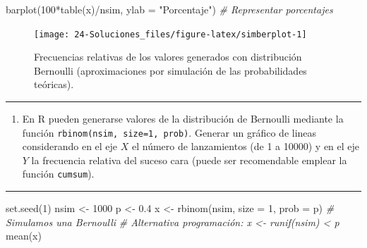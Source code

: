 \documentclass[
]{book}
\newenvironment{Shaded}{\begin{snugshade}}{\end{snugshade}}
\newcommand{\AttributeTok}[1]{\textcolor[rgb]{0.77,0.63,0.00}{#1}}
\newcommand{\CommentTok}[1]{\textcolor[rgb]{0.56,0.35,0.01}{\textit{#1}}}
\newcommand{\DecValTok}[1]{\textcolor[rgb]{0.00,0.00,0.81}{#1}}
\newcommand{\FloatTok}[1]{\textcolor[rgb]{0.00,0.00,0.81}{#1}}
\newcommand{\FunctionTok}[1]{\textcolor[rgb]{0.00,0.00,0.00}{#1}}
\newcommand{\NormalTok}[1]{#1}
\newcommand{\OtherTok}[1]{\textcolor[rgb]{0.56,0.35,0.01}{#1}}
\newcommand{\SpecialCharTok}[1]{\textcolor[rgb]{0.00,0.00,0.00}{#1}}
\newcommand{\StringTok}[1]{\textcolor[rgb]{0.31,0.60,0.02}{#1}}
\providecommand{\tightlist}{%
  \setlength{\itemsep}{0pt}\setlength{\parskip}{0pt}}
\theoremstyle{break}
\theoremstyle{nonumberplain}
\begin{document}
\begin{Shaded}
\begin{Highlighting}[]
\FunctionTok{barplot}\NormalTok{(}\DecValTok{100}\SpecialCharTok{*}\FunctionTok{table}\NormalTok{(x)}\SpecialCharTok{/}\NormalTok{nsim, }\AttributeTok{ylab =} \StringTok{"Porcentaje"}\NormalTok{) }\CommentTok{\# Representar porcentajes }
\end{Highlighting}
\end{Shaded}

\begin{figure}[!htb]

{\centering \texttt{[image: 24-Soluciones\_files/figure-latex/simberplot-1]} 

}

\caption{Frecuencias relativas de los valores generados con distribución Bernoulli (aproximaciones por simulación de las probabilidades teóricas).}\label{fig:simberplot}
\end{figure}

\begin{center}\rule{0.5\linewidth}{0.5pt}\end{center}

\begin{enumerate}
\def\labelenumi{\alph{enumi})}
\setcounter{enumi}{1}
\tightlist
\item
  En R pueden generarse valores de la distribución de Bernoulli
  mediante la función \texttt{rbinom(nsim,\ size=1,\ prob)}. Generar un
  gráfico de lineas considerando en el eje \(X\) el número de
  lanzamientos (de 1 a 10000) y en el eje \(Y\) la frecuencia
  relativa del suceso cara (puede ser recomendable emplear la
  función \texttt{cumsum}).
\end{enumerate}

\begin{center}\rule{0.5\linewidth}{0.5pt}\end{center}

\begin{Shaded}
\begin{Highlighting}[]
\FunctionTok{set.seed}\NormalTok{(}\DecValTok{1}\NormalTok{)}
\NormalTok{nsim }\OtherTok{\textless{}{-}} \DecValTok{1000}
\NormalTok{p }\OtherTok{\textless{}{-}} \FloatTok{0.4}
\NormalTok{x }\OtherTok{\textless{}{-}} \FunctionTok{rbinom}\NormalTok{(nsim, }\AttributeTok{size =} \DecValTok{1}\NormalTok{, }\AttributeTok{prob =}\NormalTok{ p) }\CommentTok{\# Simulamos una Bernoulli}
\CommentTok{\# Alternativa programación: x \textless{}{-} runif(nsim) \textless{} p}
\FunctionTok{mean}\NormalTok{(x)}
\end{Highlighting}
\end{Shaded}
\end{document}
